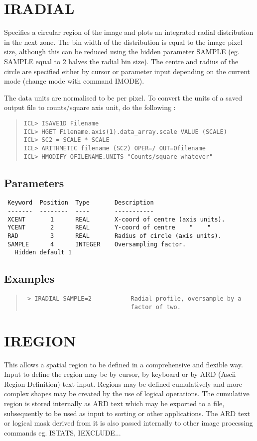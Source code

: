 \documentclass{book}
\renewcommand{\_}{{\tt\char'137}}     %
\begin{document}
\section{IRADIAL}
Specifies a circular region of the image and plots an integrated
radial distribution in the next zone. The bin width of the
distribution is equal to the image pixel size, although this can
be reduced using the hidden parameter SAMPLE (eg. SAMPLE equal to
2 halves the radial bin size). The centre and radius of the circle
are specified either by cursor or parameter input depending on the
current mode (change mode with command IMODE).

The data units are normalised to be per pixel. To convert the
units of a saved output file to counts/square axis unit, do
the following :

\begin{quote}\begin{verbatim}
ICL> ISAVE1D Filename
ICL> HGET Filename.axis(1).data_array.scale VALUE (SCALE)
ICL> SC2 = SCALE * SCALE
ICL> ARITHMETIC filename (SC2) OPER=/ OUT=Ofilename
ICL> HMODIFY OFILENAME.UNITS "Counts/square whatever"
\end{verbatim}\end{quote}
\subsection{Parameters}
\begin{verbatim}
 Keyword  Position  Type       Description
 -------  --------  ----       -----------
 XCENT       1      REAL       X-coord of centre (axis units).
 YCENT       2      REAL       Y-coord of centre    "    "
 RAD         3      REAL       Radius of circle (axis units).
 SAMPLE      4      INTEGER    Oversampling factor.
   Hidden default 1

\end{verbatim}\subsection{Examples}
\begin{quote}\begin{verbatim}
 > IRADIAL SAMPLE=2           Radial profile, oversample by a
                              factor of two.
\end{verbatim}\end{quote}
\section{IREGION}
This allows a spatial region to be defined in a comprehensive and
flexible way. Input to define the region may be by cursor, by
keyboard or by ARD (Ascii Region Definition) text input. Regions
may be defined cumulatively and more complex shapes may be created
by the use of logical operations. The cumulative region is stored
internally as ARD text which may be exported to a file, subsequently
to be used as input to sorting or other applications. The ARD text
or logical mask derived from it is also passed internally to other
image processing commands eg. ISTATS, IEXCLUDE...
\end{document}
